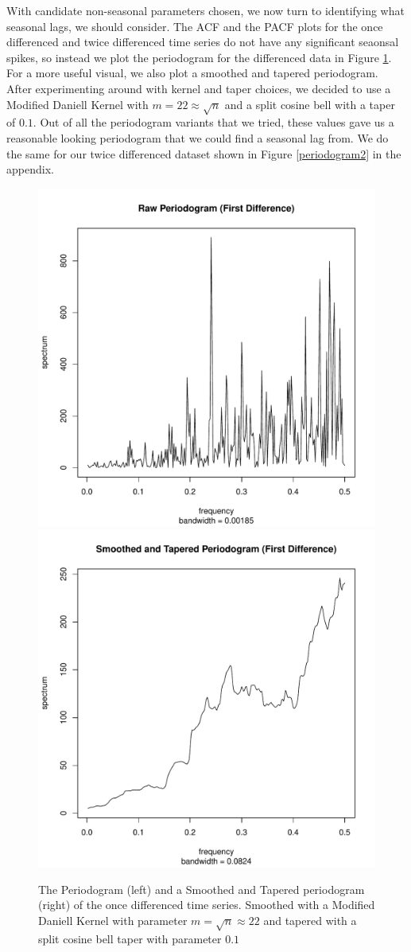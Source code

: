 \documentclass[11pt]{paper}
\begin{document}

With candidate non-seasonal parameters chosen, we now turn to identifying what seasonal lags, we should consider. The ACF and the PACF plots for the once differenced and twice differenced time series do not have any significant seaonsal spikes, so instead we plot the periodogram for the differenced data in Figure \ref{periodogram}. For a more useful visual, we also plot a smoothed and tapered periodogram. After experimenting around with kernel and taper choices, we decided to use a Modified Daniell Kernel with $m = 22 \approx \sqrt{n}$ and a split cosine bell with a taper of $0.1$. Out of all the periodogram variants that we tried, these values gave us a reasonable looking periodogram that we could find a seasonal lag from. We do the same for our twice differenced dataset shown in Figure \ref{periodogram2} in the appendix.

\begin{figure}
\centering
\includegraphics[width=0.45\linewidth]{../image/raw_periodogram.pdf}
\includegraphics[width=0.45\linewidth]{../image/smooth_tapered_periodogram.pdf}
\caption{The Periodogram (left) and a Smoothed and Tapered periodogram (right) of the once differenced time series. Smoothed with a Modified Daniell Kernel with parameter $m = \sqrt{n} \approx 22$ and tapered with a split cosine bell taper with parameter $0.1$}
\label{periodogram}
\end{figure}
\end{document}
